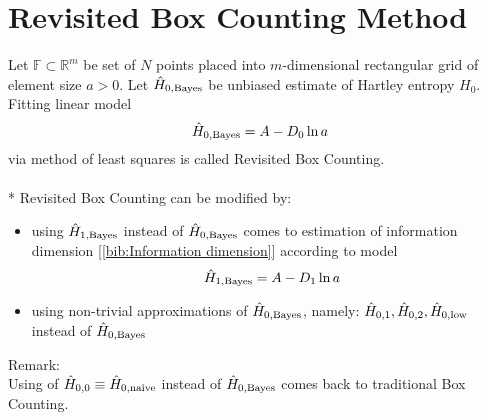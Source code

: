 \section {Revisited Box Counting Method}
Let $\mathbb{F} \subset \mathbb{R}^{m}$ be set of $N$ points placed into $m$-dimensional rectangular grid of element size $a > 0$. Let $\hat{H}_{0,\mbox{\scriptsize{Bayes}}}$ be unbiased estimate of Hartley entropy $H_{0}$. Fitting linear model
\begin{equation} 
\label{eq:hlinmod}
\hat{H}_{0,\mbox{\scriptsize{Bayes}}} = A - D_{0}\ln{a}
\end{equation}
via method of least squares is called Revisited Box Counting.\\
\\*
Revisited Box Counting can be modified by:
\begin{itemize}
\item using $\hat{H}_{1,\mbox{\scriptsize{Bayes}}}$ instead of $\hat{H}_{0,\mbox{\scriptsize{Bayes}}}$ comes to estimation of information dimension [\ref{bib:Information dimension}] according to model
\begin{equation} 
\label{eq:inform}
\hat{H}_{1,\mbox{\scriptsize{Bayes}}} = A - D_{1}\ln{a}
\end{equation}
\item using non-trivial approximations of $\hat{H}_{0,\mbox{\scriptsize{Bayes}}}$, namely: $\hat{H}_{0,1}, \hat{H}_{0,2}, \hat{H}_{0,\mbox{\scriptsize{low}}}$ instead of $\hat{H}_{0,\mbox{\scriptsize{Bayes}}}$
\end{itemize}
Remark: \\
Using of $\hat{H}_{0,0} \equiv \hat{H}_{0,\mbox{\scriptsize{naive}}}$ instead of $\hat{H}_{0,\mbox{\scriptsize{Bayes}}}$ comes back to traditional Box Counting.
